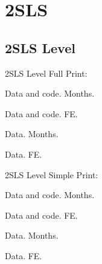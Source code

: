 \documentclass{beamer}
\begin{document}
\begin{frame}{}
\scalebox{0.5}{}
\end{frame}

\begin{frame}{}
\scalebox{0.5}{}
\end{frame}

\begin{frame}{}
\scalebox{0.5}{}
\end{frame}

\begin{frame}{}
\scalebox{0.5}{}
\end{frame}



\section{2SLS}
\subsection{2SLS Level}
\begin{frame}{2SLS Level}
Full Print:

Data and code. Months.

Data and code. FE.

Data. Months.

Data. FE.
\end{frame}

\begin{frame}{}
\scalebox{0.45}{}
\end{frame}

\begin{frame}{}
\scalebox{0.45}{}
\end{frame}

\begin{frame}{}
\scalebox{0.45}{}
\end{frame}

\begin{frame}{}
\scalebox{0.45}{}
\end{frame}

\begin{frame}{2SLS Level}
Simple Print:

Data and code. Months.

Data and code. FE.

Data. Months.

Data. FE.
\end{frame}
\begin{frame}{}
\scalebox{0.6}{}
\end{frame}
\end{document}
